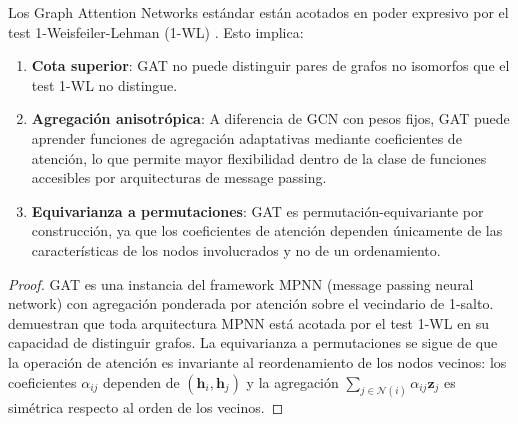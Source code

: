 \begin{proposition}\label{prop:gat_expressive_power}
Los Graph Attention Networks estándar están acotados en poder expresivo por el test 1-Weisfeiler-Lehman (1-WL) \citep{xu2019how}. Esto implica:
\begin{enumerate}
    \item \textbf{Cota superior}: GAT no puede distinguir pares de grafos no isomorfos que el test 1-WL no distingue.
    \item \textbf{Agregación anisotrópica}: A diferencia de \gls{GCN} con pesos fijos, GAT puede aprender funciones de agregación adaptativas mediante coeficientes de atención, lo que permite mayor flexibilidad dentro de la clase de funciones accesibles por arquitecturas de message passing.
    \item \textbf{Equivarianza a permutaciones}: GAT es permutación-equivariante por construcción, ya que los coeficientes de atención dependen únicamente de las características de los nodos involucrados y no de un ordenamiento.
\end{enumerate}
\end{proposition}

\begin{proof}
GAT es una instancia del framework MPNN (message passing neural network) con agregación ponderada por atención sobre el vecindario de 1-salto. \citet{xu2019how} demuestran que toda arquitectura MPNN está acotada por el test 1-WL en su capacidad de distinguir grafos. La equivarianza a permutaciones se sigue de que la operación de atención es invariante al reordenamiento de los nodos vecinos: los coeficientes $\alpha_{ij}$ dependen de $(\mathbf{h}_i, \mathbf{h}_j)$ y la agregación $\sum_{j \in \mathcal{N}(i)} \alpha_{ij} \mathbf{z}_j$ es simétrica respecto al orden de los vecinos.
\end{proof}


